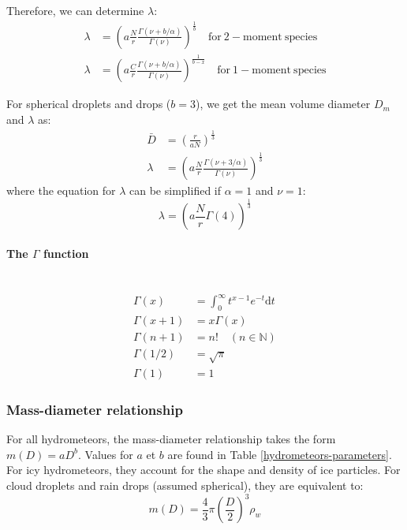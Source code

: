 Therefore, we can determine $\lambda$:
\begin{align}
 \lambda &= \left( a \frac{N}{r} \frac{\Gamma(\nu+b/\alpha)}{\Gamma(\nu)} \right)^{\frac{1}{b}} \quad \mathrm{for~2-moment~species} \\
 \lambda &= \left( a \frac{C}{r} \frac{\Gamma(\nu+b/\alpha)}{\Gamma(\nu)} \right)^{\frac{1}{b-x}} \quad \mathrm{for~1-moment~species}
\end{align}

For spherical droplets and drops ($b=3$), we get the mean volume diameter $D_m$ and $\lambda$ as:
\begin{align}
 \bar{D} &= \left( \frac{r}{a N} \right)^{\frac{1}{3}} \\
 \lambda &= \left( a \frac{N}{r} \frac{\Gamma(\nu+3/\alpha)}{\Gamma(\nu)} \right)^{\frac{1}{3}}
\end{align}
where the equation for $\lambda$ can be simplified if $\alpha=1$ and $\nu=1$:
\begin{equation}
  \lambda = \left( a \frac{N}{r} \Gamma(4) \right)^{\frac{1}{3}}
\end{equation}

\paragraph{The $\Gamma$ function}
~\\
\begin{align}
 \Gamma(x) &= \int_0^\infty t^{x-1} e^{-t} \mathrm{d}t \\
 \Gamma(x+1) &= x\Gamma(x) \\
 \Gamma(n+1) &= n! \quad (n \in \mathbb{N}) \\
 \Gamma(1/2) &= \sqrt{\pi} \\
 \Gamma(1) &= 1
\end{align}

\subsubsection{Mass-diameter relationship}

For all hydrometeors, the mass-diameter relationship takes the form $m(D)=aD^b$. Values for $a$ et $b$ are found in Table \ref{hydrometeors-parameters}. For icy hydrometeors, they account for the shape and density of ice particles. For cloud droplets and rain drops (assumed spherical), they are equivalent to:
\begin{equation}
 \label{mD}
 m(D) = \frac{4}{3} \pi \left(\frac{D}{2}\right)^3 \rho_{w}
\end{equation}

